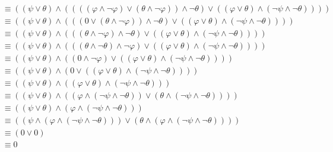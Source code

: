 \documentclass[12pt,a4paper]{scrartcl}
\begin{document}
\begin{align}
    & \equiv ((\psi \vee \theta) \wedge ((((\varphi \wedge \neg \varphi) \vee (\theta \wedge \neg \varphi)) \wedge \neg \theta) \vee ((\varphi \vee \theta) \wedge (\neg \psi \wedge \neg \theta)))) \\
    & \equiv ((\psi \vee \theta) \wedge (((0 \vee (\theta \wedge \neg \varphi)) \wedge \neg \theta) \vee ((\varphi \vee \theta) \wedge (\neg \psi \wedge \neg \theta)))) \\
    & \equiv ((\psi \vee \theta) \wedge (((\theta \wedge \neg \varphi) \wedge \neg \theta) \vee ((\varphi \vee \theta) \wedge (\neg \psi \wedge \neg \theta)))) \\
    & \equiv ((\psi \vee \theta) \wedge (((\theta \wedge \neg \theta) \wedge \neg \varphi) \vee ((\varphi \vee \theta) \wedge (\neg \psi \wedge \neg \theta)))) \\
    & \equiv ((\psi \vee \theta) \wedge ((0 \wedge \neg \varphi) \vee ((\varphi \vee \theta) \wedge (\neg \psi \wedge \neg \theta)))) \\
    & \equiv ((\psi \vee \theta) \wedge (0 \vee ((\varphi \vee \theta) \wedge (\neg \psi \wedge \neg \theta)))) \\
    & \equiv ((\psi \vee \theta) \wedge ((\varphi \vee \theta) \wedge (\neg \psi \wedge \neg \theta))) \\
    & \equiv ((\psi \vee \theta) \wedge ((\varphi \wedge (\neg \psi \wedge \neg \theta)) \vee (\theta \wedge (\neg \psi \wedge \neg \theta)))) \\
    & \equiv ((\psi \vee \theta) \wedge (\varphi \wedge (\neg \psi \wedge \neg \theta))) \\
    & \equiv ((\psi \wedge (\varphi \wedge (\neg \psi \wedge \neg \theta))) \vee (\theta \wedge (\varphi \wedge (\neg \psi \wedge \neg \theta)))) \\
    & \equiv (0 \vee 0) \\
    & \equiv 0
\end{align}
\end{document}
